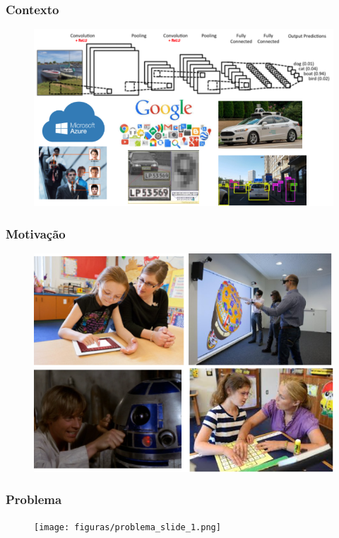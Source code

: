 \documentclass{beamer}
\begin{document}
\begin{frame}
\frametitle{Contexto}
\begin{figure}
\centering
\includegraphics[scale=0.39]{figuras/contexto_3.png}
\label{fig:problema1}
\end{figure}
\end{frame}

\begin{frame}
\frametitle{Motivação}
\begin{figure}
\centering
\includegraphics[scale=0.39]{figuras/contexto_4.png}
\label{fig:problema1}
\end{figure}
\end{frame}


\begin{frame}
\frametitle{Problema}

\begin{figure}
\centering
\texttt{[image: figuras/problema\_slide\_1.png]}
\label{fig:problema1}
\end{figure}

\end{frame}
\end{document}
